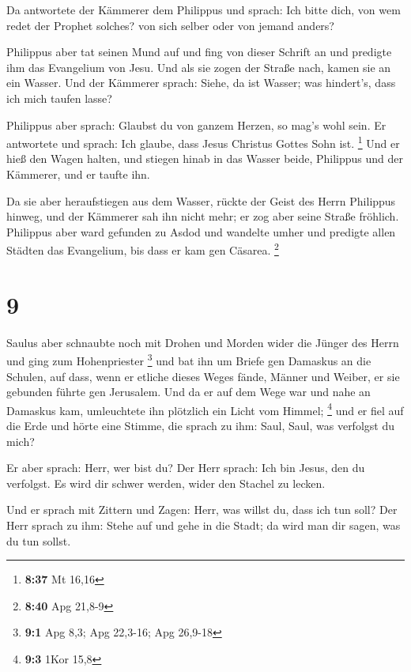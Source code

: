  Da antwortete der Kämmerer dem Philippus und sprach: Ich
bitte dich, von wem redet der Prophet solches? von sich selber oder von
jemand anders?

 Philippus aber tat seinen Mund auf und fing von dieser
Schrift an und predigte ihm das Evangelium von Jesu.  Und
als sie zogen der Straße nach, kamen sie an ein Wasser. Und der Kämmerer
sprach: Siehe, da ist Wasser; was hindert's, dass ich mich taufen lasse?

 Philippus aber sprach: Glaubst du von ganzem Herzen, so
mag's wohl sein. Er antwortete und sprach: Ich glaube, dass Jesus
Christus Gottes Sohn ist. \footnote{\textbf{8:37} Mt 16,16}
 Und er hieß den Wagen halten, und stiegen hinab in das
Wasser beide, Philippus und der Kämmerer, und er taufte ihn.

 Da sie aber heraufstiegen aus dem Wasser, rückte der
Geist des Herrn Philippus hinweg, und der Kämmerer sah ihn nicht mehr;
er zog aber seine Straße fröhlich.  Philippus aber ward
gefunden zu Asdod und wandelte umher und predigte allen Städten das
Evangelium, bis dass er kam gen Cäsarea. \footnote{\textbf{8:40} Apg
  21,8-9}

\hypertarget{section-2}{%
\section{9}\label{section-2}}

 Saulus aber schnaubte noch mit Drohen und Morden wider
die Jünger des Herrn und ging zum Hohenpriester \footnote{\textbf{9:1}
  Apg 8,3; Apg 22,3-16; Apg 26,9-18}  und bat ihn um
Briefe gen Damaskus an die Schulen, auf dass, wenn er etliche dieses
Weges fände, Männer und Weiber, er sie gebunden führte gen Jerusalem.
 Und da er auf dem Wege war und nahe an Damaskus kam,
umleuchtete ihn plötzlich ein Licht vom Himmel; \footnote{\textbf{9:3}
  1Kor 15,8}  und er fiel auf die Erde und hörte eine
Stimme, die sprach zu ihm: Saul, Saul, was verfolgst du mich?

 Er aber sprach: Herr, wer bist du? Der Herr sprach: Ich
bin Jesus, den du verfolgst. Es wird dir schwer werden, wider den
Stachel zu lecken.

 Und er sprach mit Zittern und Zagen: Herr, was willst du,
dass ich tun soll? Der Herr sprach zu ihm: Stehe auf und gehe in die
Stadt; da wird man dir sagen, was du tun sollst.

